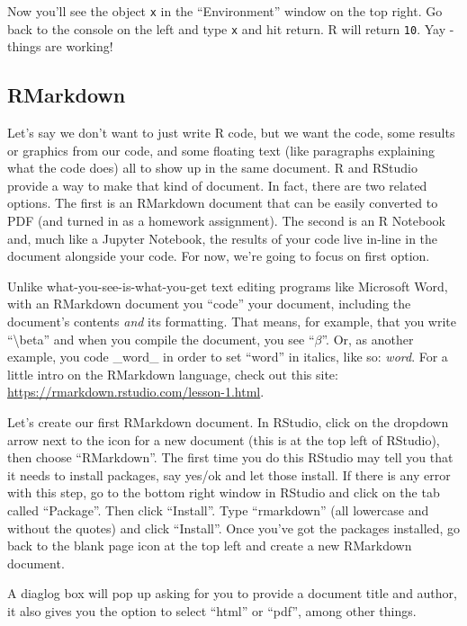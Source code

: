 \documentclass{article}\usepackage[]{graphicx}\usepackage[]{color}
\begin{document}
Now you'll see the object \texttt{x} in the ``Environment'' window on the top right. Go back to the console on the left and type \texttt{x} and hit return. R will return \texttt{10}. Yay - things are working!

\subsection*{RMarkdown} %

Let's say we don't want to just write R code, but we want the code, some results or graphics from our code, and some floating text (like paragraphs explaining what the code does) all to show up in the same document. R and RStudio provide a way to make that kind of document. In fact, there are two related options. The first is an RMarkdown document that can be easily converted to PDF (and turned in as a homework assignment). The second is an R Notebook and, much like a Jupyter Notebook, the results of your code live in-line in the document alongside your code. For now, we're going to focus on first option.

Unlike what-you-see-is-what-you-get text editing programs like Microsoft Word, with an RMarkdown document you ``code'' your document, including the document's contents \emph{and} its formatting. That means, for example, that you write ``\textbackslash beta'' and when you compile the document, you see ``$\beta$''. Or, as another example, you code \_word\_ in order to set ``word'' in italics, like so: \emph{word}. For a little intro on the RMarkdown language, check out this site: \url{https://rmarkdown.rstudio.com/lesson-1.html}.

Let's create our first RMarkdown document. In RStudio, click on the dropdown arrow next to the icon for a new document (this is at the top left of RStudio), then choose ``RMarkdown''. The first time you do this RStudio may tell you that it needs to install packages, say yes/ok and let those install. If there is any error with this step, go to the bottom right window in RStudio and click on the tab called ``Package''. Then click ``Install''. Type ``rmarkdown'' (all lowercase and without the quotes) and click ``Install''. Once you've got the packages installed, go back to the blank page icon at the top left and create a new RMarkdown document. 

A diaglog box will pop up asking for you to provide a document title and author, it also gives you the option to select ``html'' or ``pdf'', among other things. 
\end{document}
